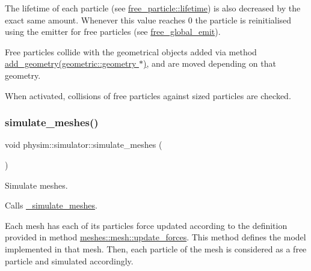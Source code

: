 The lifetime of each particle (see \hyperlink{classphysim_1_1particles_1_1free__particle_a5870d6fd3167d2c6120f887f45fe50fc}{free\+\_\+particle\+::lifetime}) is also decreased by the exact same amount. Whenever this value reaches 0 the particle is reinitialised using the emitter for free particles (see \hyperlink{classphysim_1_1simulator_a05e2840fc39c644d7005ea938e63202f}{free\+\_\+global\+\_\+emit}).

Free particles collide with the geometrical objects added via method \hyperlink{classphysim_1_1simulator_a92a79231495f047789176a19857735ff}{add\+\_\+geometry(geometric\+::geometry $\ast$)}, and are moved depending on that geometry.

When activated, collisions of free particles against sized particles are checked. \mbox{\label{classphysim_1_1simulator_aea4165314f9285dfc3b64ba9a2666aaf}} 
\subsubsection{\texorpdfstring{simulate\+\_\+meshes()}{simulate\_meshes()}}
{\footnotesize\ttfamily void physim\+::simulator\+::simulate\+\_\+meshes (\begin{DoxyParamCaption}{ }\end{DoxyParamCaption})}



Simulate meshes. 

Calls \hyperlink{classphysim_1_1simulator_ac598aa9b36e01c8cee937a8f95719cd8}{\+\_\+simulate\+\_\+meshes}.

Each mesh has each of its particle\textquotesingle{}s force updated according to the definition provided in method \hyperlink{classphysim_1_1meshes_1_1mesh_ad7cad4cd454cce562c8c404ef09f8bd3}{meshes\+::mesh\+::update\+\_\+forces}. This method defines the model implemented in that mesh. Then, each particle of the mesh is considered as a free particle and simulated accordingly. \mbox{\label{classphysim_1_1simulator_ac99a02f99b4f83501478093d402abea5}} 
